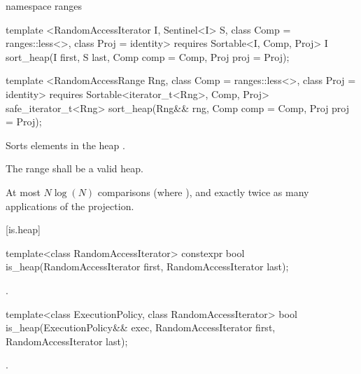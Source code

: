 \begin{addedblock}
%
\begin{itemdecl}
namespace ranges {
  template <RandomAccessIterator I, Sentinel<I> S, class Comp = ranges::less<>,
            class Proj = identity>
      requires Sortable<I, Comp, Proj>
    I sort_heap(I first, S last, Comp comp = Comp{}, Proj proj = Proj{});

  template <RandomAccessRange Rng, class Comp = ranges::less<>, class Proj = identity>
      requires Sortable<iterator_t<Rng>, Comp, Proj>
    safe_iterator_t<Rng> sort_heap(Rng&& rng, Comp comp = Comp{}, Proj proj = Proj{});
}
\end{itemdecl}

\begin{itemdescr}
\pnum
\effects
Sorts elements in the heap
.

\pnum
\requires The range  shall be a valid heap.

\pnum
\returns {}

\pnum
\complexity
At most $N \log(N)$
comparisons (where
), and exactly twice as many applications of the projection.
\end{itemdescr}
\end{addedblock}

[is.heap]{}

%
\begin{itemdecl}
template<class RandomAccessIterator>
  constexpr bool is_heap(RandomAccessIterator first, RandomAccessIterator last);
\end{itemdecl}

\begin{itemdescr}
\pnum
\returns {}.
\end{itemdescr}

%
\begin{itemdecl}
template<class ExecutionPolicy, class RandomAccessIterator>
  bool is_heap(ExecutionPolicy&& exec,
               RandomAccessIterator first, RandomAccessIterator last);
\end{itemdecl}

\begin{itemdescr}
\pnum
\returns {}.
\end{itemdescr}

